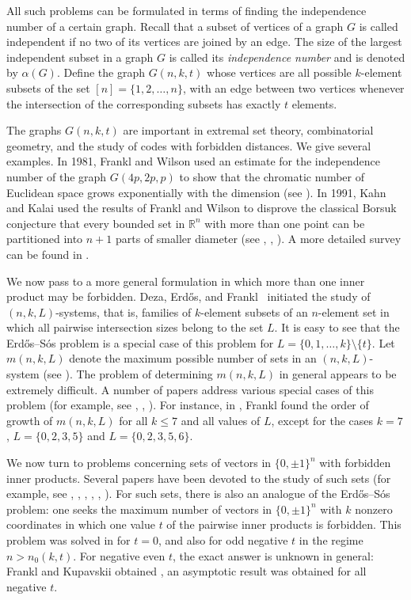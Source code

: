 \documentclass[12pt,a4paper]{article}
\begin{document}
All such problems can be formulated in terms of finding the independence number of a certain graph. Recall that a subset of vertices of a graph $G$ is called independent if no two of its vertices are joined by an edge. The size of the largest independent subset in a graph $G$ is called its \textit{independence number} and is denoted by $\alpha(G)$. Define the graph $G(n,k,t)$ whose vertices are all possible $k$-element subsets of the set $[n]=\{1,2, \ldots, n\}$, with an edge between two vertices whenever the intersection of the corresponding subsets has exactly $t$ elements.

The graphs $G(n,k,t)$ are important in extremal set theory, combinatorial geometry, and the study of codes with forbidden distances. We give several examples. In 1981, Frankl and Wilson used an estimate for the independence number of the graph $G(4p,2p,p)$ to show that the chromatic number of Euclidean space grows exponentially with the dimension (see \cite{FW}). In 1991, Kahn and Kalai used the results of Frankl and Wilson to disprove the classical Borsuk conjecture that every bounded set in $\mathbb{R}^{n}$ with more than one point can be partitioned into $n+1$ parts of smaller diameter (see \cite{KK}, \cite{RB}, \cite{RB2}). A more detailed survey can be found in \cite{Gnkt}.

We now pass to a more general formulation in which more than one inner product may be forbidden. Deza, Erd\H{o}s, and Frankl~\cite{DEF} initiated the study of $(n,k,L)$-systems, that is, families of $k$-element subsets of an $n$-element set in which all pairwise intersection sizes belong to the set $L$. It is easy to see that the Erd\H{o}s--S\'os problem is a special case of this problem for $L=\{0,1,\ldots,k\} \setminus \{t\}$. Let $m(n,k,L)$ denote the maximum possible number of sets in an $(n,k,L)$-system (see \cite{KupSur}). The problem of determining $m(n,k,L)$ in general appears to be extremely difficult. A number of papers address various special cases of this problem (for example, see \cite{AK}, \cite{DES}, \cite{Fur}). For instance, in \cite{Fr}, Frankl found the order of growth of $m(n,k,L)$ for all $k \leqslant 7$ and all values of $L$, except for the cases $k=7$, $L=\{0,2,3,5\}$ and $L=\{0,2,3,5,6\}$.

We now turn to problems concerning sets of vectors in $\{0,\pm 1\}^n$ with forbidden inner products. Several papers have been devoted to the study of such sets (for example, see \cite{CK}, \cite{PR}, \cite{ABR}, \cite{LR}, \cite{FK}, \cite{FK2}). For such sets, there is also an analogue of the Erd\H{o}s--S\'os problem: one seeks the maximum number of vectors in $\{0,\pm 1\}^n$ with $k$ nonzero coordinates in which one value $t$ of the pairwise inner products is forbidden. This problem was solved in \cite{CK} for $t=0$, and also for odd negative $t$ in the regime $n>n_0(k,t)$. For negative even $t$, the exact answer is unknown in general: Frankl and Kupavskii obtained \cite{FKanti}, an asymptotic result was obtained for all negative $t$.
\end{document}

